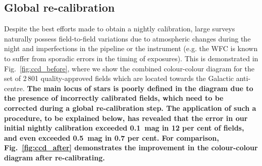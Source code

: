 \documentclass[a4paper,useAMS,usenatbib]{mn2e}
\begin{document}
\subsection{Global re-calibration}

Despite the best efforts made to obtain a nightly calibration,
large surveys naturally possess field-to-field variations
due to atmospheric changes during the night
and imperfections in the pipeline or the instrument
(e.g. the WFC is known to suffer from sporadic errors
in the timing of exposures).
This is demonstrated in Fig.~\ref{fig:ccd_before},
where we show the combined colour-colour diagram
for the set of 2\,801 quality-approved fields
which are located towards the Galactic anti-centre.
{ \bf
The main locus of stars is poorly defined
in the diagram due to the presence of
incorrectly calibrated fields,
which need to be corrected
during a global re-calibration step.
The application of such a procedure,
to be explained below,
has revealed that the error in our initial nightly calibration
exceeded 0.1~mag in 12 per cent of fields,
and even exceeded 0.5~mag in 0.7 per cent.
For comparison, Fig.~\ref{fig:ccd_after}
demonstrates the improvement 
in the colour-colour diagram
after re-calibrating. }
\end{document}
